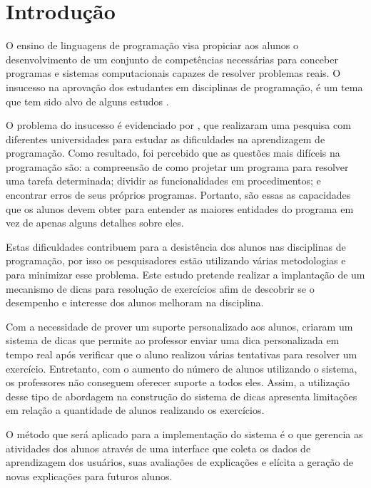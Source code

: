 \chapter{Introdução}

	O ensino de linguagens de programação visa propiciar aos alunos o desenvolvimento de um conjunto de competências necessárias para conceber programas e sistemas computacionais capazes de resolver problemas reais. O insucesso na aprovação dos estudantes em disciplinas de programação, é um tema que tem sido alvo de alguns estudos \cite{bosse2015reprovaccoes, Cukierman:2015:PSU:2729094.2742623}.
	
	O problema do insucesso é evidenciado por , que realizaram uma pesquisa com diferentes universidades para estudar as dificuldades na aprendizagem de programação. Como resultado, foi percebido que as questões mais difíceis na programação são: a compreensão de como projetar um programa para resolver uma tarefa determinada; dividir as funcionalidades em procedimentos; e encontrar erros de seus próprios programas. Portanto, são essas as capacidades que os alunos devem obter para entender as maiores entidades do programa em vez de apenas alguns detalhes sobre eles.
	
	Estas dificuldades contribuem para a desistência dos alunos nas disciplinas de programação, por isso os pesquisadores estão utilizando várias metodologias e  para minimizar esse problema. Este estudo pretende realizar a implantação de um mecanismo de dicas para resolução de exercícios afim de descobrir se o desempenho e interesse dos alunos melhoram na disciplina. 
	
	Com a necessidade de prover um suporte personalizado aos alunos,  criaram um sistema de dicas que permite ao professor enviar uma dica personalizada em tempo real após verificar que o aluno realizou várias tentativas para resolver um exercício. Entretanto, com o aumento do número de alunos utilizando o sistema, os professores não conseguem oferecer suporte a todos eles. Assim, a utilização desse tipo de abordagem na construção do sistema de dicas apresenta limitações em relação a quantidade de alunos realizando os exercícios.
	
	O método que será aplicado para a implementação do sistema é o  que gerencia as atividades dos alunos através de uma interface que coleta os dados de aprendizagem dos usuários, suas avaliações de explicações e elícita a geração de novas explicações para futuros alunos.

